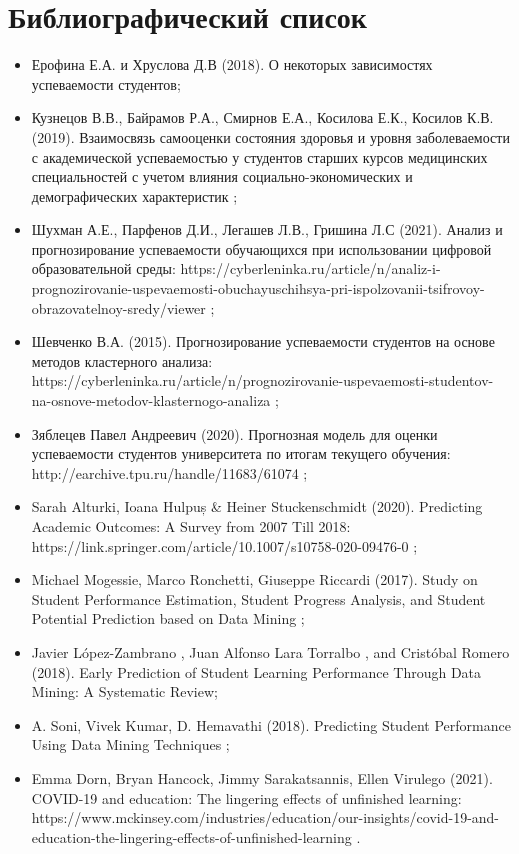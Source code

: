 \documentclass{article}
\begin{document}
\section*{Библиографический список}
\begin{itemize}
    \item Ерофина Е.А. и Хруслова Д.В (2018). О некоторых зависимостях успеваемости студентов;
    \item Кузнецов В.В., Байрамов Р.А., Смирнов Е.А., Косилова Е.К., Косилов К.В. (2019). Взаимосвязь самооценки состояния здоровья и уровня заболеваемости с академической успеваемостью у студентов старших курсов медицинских специальностей с учетом влияния социально-экономических и демографических характеристик ;
    \item Шухман А.Е., Парфенов Д.И., Легашев Л.В., Гришина Л.С (2021). Анализ и прогнозирование успеваемости обучающихся при использовании цифровой образовательной среды: https://cyberleninka.ru/article/n/analiz-i-prognozirovanie-uspevaemosti-obuchayuschihsya-pri-ispolzovanii-tsifrovoy-obrazovatelnoy-sredy/viewer ;
    \item Шевченко В.А. (2015). Прогнозирование успеваемости студентов на основе методов кластерного анализа: https://cyberleninka.ru/article/n/prognozirovanie-uspevaemosti-studentov-na-osnove-metodov-klasternogo-analiza ;
    \item Зяблецев Павел Андреевич (2020). Прогнозная модель для оценки успеваемости студентов университета по итогам текущего обучения: http://earchive.tpu.ru/handle/11683/61074 ;
    \item Sarah Alturki, Ioana Hulpuș & Heiner Stuckenschmidt (2020). Predicting Academic Outcomes: A Survey from 2007 Till 2018: https://link.springer.com/article/10.1007/s10758-020-09476-0 ;
    \item Michael Mogessie, Marco Ronchetti, Giuseppe Riccardi (2017). Study on Student Performance Estimation, Student Progress Analysis, and Student Potential Prediction based on Data Mining ;
    \item Javier López-Zambrano , Juan Alfonso Lara Torralbo , and Cristóbal Romero (2018). Early Prediction of Student Learning Performance Through Data Mining: A Systematic Review;
    \item A. Soni, Vivek Kumar, D. Hemavathi (2018). Predicting Student Performance Using Data Mining Techniques ;
    \item Emma Dorn, Bryan Hancock, Jimmy Sarakatsannis, Ellen Virulego (2021). COVID-19 and education: The lingering effects of unfinished learning: https://www.mckinsey.com/industries/education/our-insights/covid-19-and-education-the-lingering-effects-of-unfinished-learning .
\end{itemize}
\end{document}
